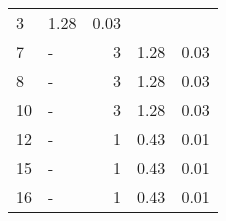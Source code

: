 \begin{longtable}{lXrrr}
       \num{3} &
       \num[round-mode=places,round-precision=2]{1.28} &
         \num[round-mode=places,round-precision=2]{0.03} \\

     7 &
     \multicolumn{1}{X}{ -  } &


       \num{3} &
       \num[round-mode=places,round-precision=2]{1.28} &
         \num[round-mode=places,round-precision=2]{0.03} \\

     8 &
     \multicolumn{1}{X}{ -  } &


       \num{3} &
       \num[round-mode=places,round-precision=2]{1.28} &
         \num[round-mode=places,round-precision=2]{0.03} \\

     10 &
     \multicolumn{1}{X}{ -  } &


       \num{3} &
       \num[round-mode=places,round-precision=2]{1.28} &
         \num[round-mode=places,round-precision=2]{0.03} \\

     12 &
     \multicolumn{1}{X}{ -  } &


       \num{1} &
       \num[round-mode=places,round-precision=2]{0.43} &
         \num[round-mode=places,round-precision=2]{0.01} \\

     15 &
     \multicolumn{1}{X}{ -  } &


       \num{1} &
       \num[round-mode=places,round-precision=2]{0.43} &
         \num[round-mode=places,round-precision=2]{0.01} \\

     16 &
     \multicolumn{1}{X}{ -  } &


       \num{1} &
       \num[round-mode=places,round-precision=2]{0.43} &
         \num[round-mode=places,round-precision=2]{0.01} \\


\end{longtable}
